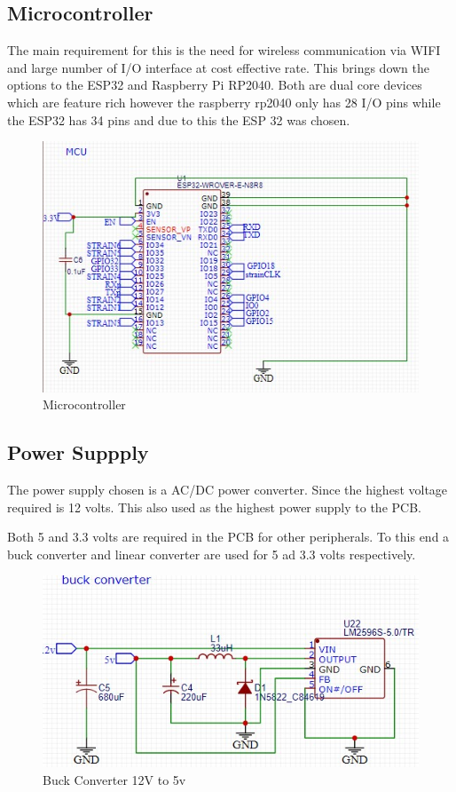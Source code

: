 \subsection{Microcontroller}
The main requirement for this is the need for wireless communication via WIFI and large number of I/O interface at cost effective rate. This brings down the options to the ESP32 and Raspberry Pi RP2040. Both are dual core devices which are feature rich however the raspberry rp2040 only has 28 I/O pins while the ESP32 has 34 pins and due to this the ESP 32 was chosen. 
\begin{center}
	\begin{figure}[!h]
	\centering
	\includegraphics{Figures/mcu}
	\caption[Microcotroller]{Microcontroller}
	\end{figure}
\end{center}

\subsection{Power Suppply}
The power supply chosen is a AC/DC power converter. Since the highest voltage required is 12 volts. This also used as the highest power supply to the PCB.

Both 5 and 3.3 volts are required in the PCB for other peripherals. To this end a buck converter and linear converter are used for 5 ad 3.3 volts respectively.

\begin{center}
	\begin{figure}[!h]
	\centering
	\includegraphics{Figures/buck}
	\caption[Buck converter]{Buck Converter 12V to 5v}
	\end{figure}
\end{center}

